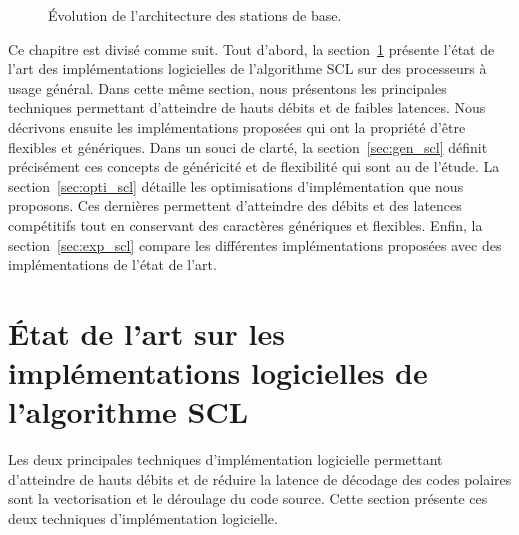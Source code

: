 \begin{figure}[ht]
{  \label{fig:bbu}
  }
  \quad\quad
  \caption{\'Evolution de l'architecture des stations de base.}
  \label{fig:bs_evo}
\end{figure}

Ce chapitre est divisé comme suit. Tout d'abord, la section~\ref{sec:art_scl} présente l'état de l'art des implémentations logicielles de l'algorithme SCL sur des processeurs à usage général. Dans cette même section, nous présentons les principales techniques permettant d'atteindre de hauts débits et de faibles latences. 
Nous décrivons ensuite les implémentations proposées qui ont la propriété d'être flexibles et génériques. Dans un souci de clarté, la section~\ref{sec:gen_scl} définit précisément ces concepts de généricité et de flexibilité qui sont au \coeur de l'étude. La section~\ref{sec:opti_scl} détaille les optimisations d'implémentation que nous proposons. Ces dernières permettent d'atteindre des débits et des latences compétitifs tout en conservant des caractères génériques et flexibles. Enfin, la section~\ref{sec:exp_scl} compare les différentes implémentations proposées avec des implémentations de l'état de l'art.

\section{\'Etat de l'art sur les implémentations logicielles de l'algorithme SCL}
\label{sec:art_scl}
Les deux principales techniques d'implémentation logicielle permettant d'atteindre de hauts débits et de réduire la latence de décodage des codes polaires sont la vectorisation et le déroulage du code source. Cette section présente ces deux techniques d'implémentation logicielle.

